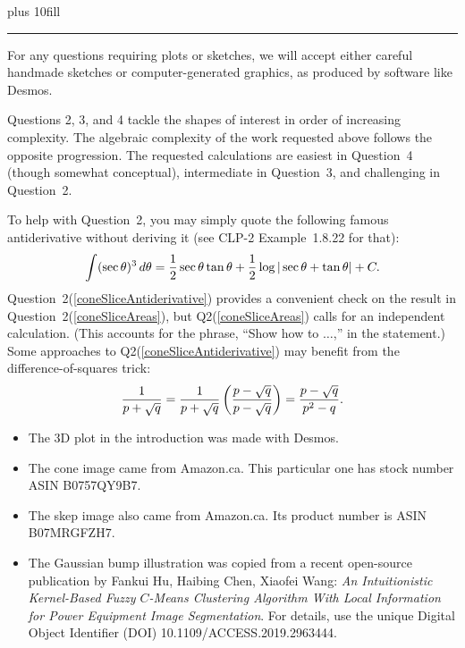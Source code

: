 \documentclass{exam}
\newcommand{\lr}[3]{\left#1{\mathstrut#3}\right#2}
\newcommand{\abs}[1]{\lr\vert\vert{#1}}
\begin{document}
\vskip 0pt plus 10fill

\bigbreak\hrule\medskip


For any questions requiring plots or sketches,
we will accept either careful handmade sketches or computer-generated
graphics, as produced by software like Desmos.

Questions 2, 3, and 4 tackle the shapes of interest 
in order of increasing complexity.
The algebraic complexity of the work requested above
follows the opposite progression.
The requested calculations are easiest in Question~4
(though somewhat conceptual),
intermediate in Question~3, 
and challenging in Question~2.

To help with Question~2,
you may simply quote the following famous antiderivative without
deriving it (see CLP-2 Example~1.8.22 for that):
\[
\int (\sec\theta)^3\,d\theta
= \frac12\sec\theta\tan\theta + \frac12\log\abs{\sec\theta+\tan\theta} + C.
\]
Question~2(\ref{coneSliceAntiderivative}) provides a 
convenient check on the result in Question~2(\ref{coneSliceAreas}),
but Q2(\ref{coneSliceAreas}) calls for an independent calculation.
(This accounts for the phrase, ``Show how to $\ldots$,'' in the statement.)
Some approaches to Q2(\ref{coneSliceAntiderivative}) may benefit from
the difference-of-squares trick:
\[
\dfrac{1}{p+\sqrt{q}}
= \dfrac{1}{p+\sqrt{q}}\lr(){ \dfrac{p-\sqrt{q}}{p-\sqrt{q}}}
= \dfrac{ p-\sqrt{q}}{p^2-q}.
\]



\begin{itemize}
\item
The 3D plot in the introduction was made with Desmos.

\item
The cone image came from Amazon.ca.
This particular one has stock number ASIN B0757QY9B7.

\item
The skep image also came from Amazon.ca.
Its product number is ASIN B07MRGFZH7.

\item
The Gaussian bump illustration was copied from a
recent open-source publication by
Fankui Hu, Haibing Chen, Xiaofei Wang:
\emph{An Intuitionistic Kernel-Based Fuzzy $C$-Means Clustering Algorithm With Local Information for Power Equipment Image Segmentation}.
For details, use the unique Digital Object Identifier (DOI)
10.1109/ACCESS.2019.2963444.

\end{itemize}
\end{document}

